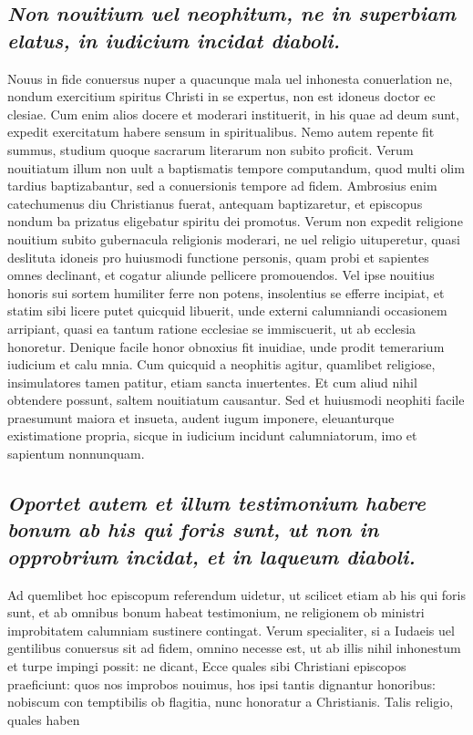 \documentclass{article}
\begin{document}
\begin{pages}
\subsection*{\textit{Non nouitium uel neophitum, ne in superbiam elatus, in iudicium incidat diaboli. }}\pstart Nouus in fide conuersus nuper a quacunque mala uel inhonesta conuerlation ne, nondum exercitium spiritus Christi in se expertus, non est idoneus doctor ec clesiae. Cum enim alios docere et moderari instituerit, in his quae ad deum sunt, expedit exercitatum habere sensum in spiritualibus. Nemo autem repente fit summus, studium quoque sacrarum literarum non subito proficit. Verum nouitiatum illum non uult a baptismatis tempore computandum, quod multi olim tardius baptizabantur, sed a conuersionis tempore ad fidem. Ambrosius enim catechumenus diu Christianus fuerat, antequam baptizaretur, et episcopus nondum ba prizatus eligebatur spiritu dei promotus. Verum non expedit religione nouitium subito gubernacula religionis moderari, ne uel religio uituperetur, quasi deslituta idoneis pro huiusmodi functione personis, quam probi et sapientes omnes declinant, et cogatur aliunde pellicere promouendos. Vel ipse nouitius honoris sui sortem humiliter ferre non potens, insolentius se efferre incipiat, et statim sibi licere putet quicquid libuerit, unde externi calumniandi occasionem arripiant, quasi ea tantum ratione ecclesiae se immiscuerit, ut ab ecclesia honoretur. Denique facile honor obnoxius fit inuidiae, unde prodit temerarium iudicium et calu mnia. Cum quicquid a neophitis agitur, quamlibet religiose, insimulatores tamen patitur, etiam sancta inuertentes. Et cum aliud nihil obtendere possunt, saltem nouitiatum causantur. Sed et huiusmodi neophiti facile praesumunt maiora et insueta, audent iugum imponere, eleuanturque existimatione propria, sicque in iudicium incidunt calumniatorum, imo et sapientum nonnunquam.  \pend
{}
{}
\subsection*{\textit{Oportet autem et illum testimonium habere bonum ab his qui foris sunt, ut non in opprobrium incidat, et in laqueum diaboli. }}\pstart Ad quemlibet hoc episcopum referendum uidetur, ut scilicet etiam ab his qui foris sunt, et ab omnibus bonum habeat testimonium, ne religionem ob ministri improbitatem calumniam sustinere contingat. Verum specialiter, si a Iudaeis uel gentilibus conuersus sit ad fidem, omnino necesse est, ut ab illis nihil inhonestum et turpe impingi possit: ne dicant, Ecce quales sibi Christiani episcopos praeficiunt: quos nos improbos nouimus, hos ipsi tantis dignantur honoribus: nobiscum con temptibilis ob flagitia, nunc honoratur a Christianis. Talis religio, quales haben  \pend

\end{pages}
\end{document}
